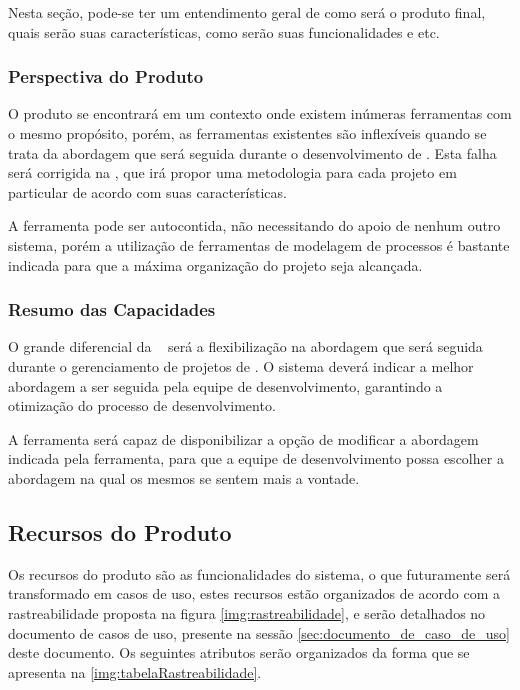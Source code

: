 Nesta seção, pode-se ter um entendimento geral de como será o produto final, quais serão suas características, como serão suas funcionalidades e etc.

\subsubsection{Perspectiva do Produto}
	
O produto se encontrará em um contexto onde existem inúmeras ferramentas com o mesmo propósito, porém, as ferramentas existentes são inflexíveis quando se trata da abordagem que será seguida durante o desenvolvimento de \sw. Esta falha será corrigida na \nomeferramenta, que irá propor uma metodologia para cada projeto em particular de acordo com suas características.

A ferramenta pode ser autocontida, não necessitando do apoio de nenhum outro sistema, porém a utilização de ferramentas de modelagem de processos é bastante indicada para que a máxima organização do projeto seja alcançada.

\subsubsection{Resumo das Capacidades}
	
O grande diferencial da \nomeferramenta~ será a flexibilização na abordagem que será seguida durante o gerenciamento de projetos de \sw. O sistema deverá indicar a melhor abordagem a ser seguida pela equipe de desenvolvimento, garantindo a otimização do processo de desenvolvimento.

A ferramenta será capaz de disponibilizar a opção de modificar a abordagem indicada pela ferramenta, para que a equipe de desenvolvimento possa escolher a abordagem na qual os mesmos se sentem mais a vontade.

\subsection{Recursos do Produto}
\label{subsub:recursos_produto}

Os recursos do produto são as funcionalidades do sistema, o que futuramente será transformado em casos de uso, estes recursos estão organizados de acordo com a rastreabilidade proposta na figura \ref{img:rastreabilidade}, e serão detalhados no documento de casos de uso, presente na sessão \ref{sec:documento_de_caso_de_uso} deste documento. Os seguintes atributos serão organizados da forma que se apresenta na \ref{img:tabelaRastreabilidade}.

